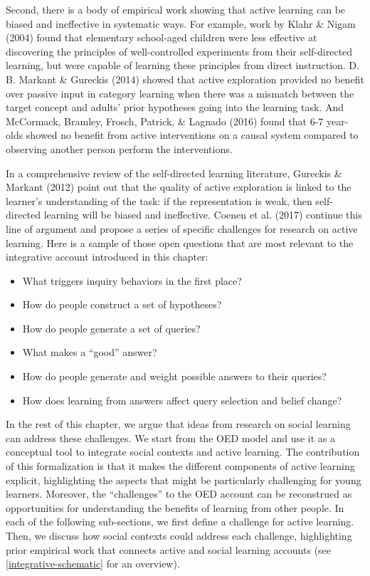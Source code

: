 \documentclass[oneside]{report}
\begin{document}
Second, there is a body of empirical work showing that active learning
can be biased and ineffective in systematic ways. For example, work by
Klahr \& Nigam (2004) found that elementary school-aged children were
less effective at discovering the principles of well-controlled
experiments from their self-directed learning, but were capable of
learning these principles from direct instruction. D. B. Markant \&
Gureckis (2014) showed that active exploration provided no benefit over
passive input in category learning when there was a mismatch between the
target concept and adults' prior hypotheses going into the learning
task. And McCormack, Bramley, Frosch, Patrick, \& Lagnado (2016) found
that 6-7 year-olds showed no benefit from active interventions on a
causal system compared to observing another person perform the
interventions.

In a comprehensive review of the self-directed learning literature,
Gureckis \& Markant (2012) point out that the quality of active
exploration is linked to the learner's understanding of the task: if the
representation is weak, then self-directed learning will be biased and
ineffective. Coenen et al. (2017) continue this line of argument and
propose a series of specific challenges for research on active learning.
Here is a sample of those open questions that are most relevant to the
integrative account introduced in this chapter:
\begin{itemize}
\tightlist
\item
  What triggers inquiry behaviors in the first place?
\item
  How do people construct a set of hypotheses?
\item
  How do people generate a set of queries?
\item
  What makes a ``good'' answer?
\item
  How do people generate and weight possible answers to their queries?
\item
  How does learning from answers affect query selection and belief
  change?
\end{itemize}
\noindent
In the rest of this chapter, we argue that ideas from research on social
learning can address these challenges. We start from the OED model and
use it as a conceptual tool to integrate social contexts and active
learning. The contribution of this formalization is that it makes the
different components of active learning explicit, highlighting the
aspects that might be particularly challenging for young learners.
Moreover, the ``challenges'' to the OED account can be reconstrued as
opportunities for understanding the benefits of learning from other
people. In each of the following sub-sections, we first define a
challenge for active learning. Then, we discuss how social contexts
could address each challenge, highlighting prior empirical work that
connects active and social learning accounts (see
\ref{integrative-schematic} for an overview).
\end{document}
